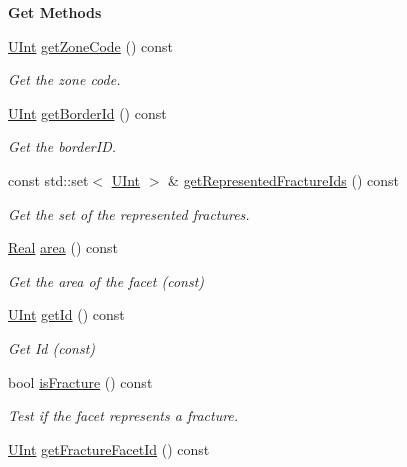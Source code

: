 \begin{Indent}{\bf Get Methods}
\begin{DoxyCompactItemize}
\hyperlink{namespaceFVCode3D_a4bf7e328c75d0fd504050d040ebe9eda}{U\+Int} \hyperlink{classFVCode3D_1_1Rigid__Mesh_1_1Facet_a051d02ca6fb8096021de8519cd6a90ed}{get\+Zone\+Code} () const 
\begin{DoxyCompactList}\small\item\em Get the zone code. \end{DoxyCompactList}\item 
\hyperlink{namespaceFVCode3D_a4bf7e328c75d0fd504050d040ebe9eda}{U\+Int} \hyperlink{classFVCode3D_1_1Rigid__Mesh_1_1Facet_a528828e73f43ae6fa5c858ecc5ab5a65}{get\+Border\+Id} () const 
\begin{DoxyCompactList}\small\item\em Get the border\+ID. \end{DoxyCompactList}\item 
const std\+::set$<$ \hyperlink{namespaceFVCode3D_a4bf7e328c75d0fd504050d040ebe9eda}{U\+Int} $>$ \& \hyperlink{classFVCode3D_1_1Rigid__Mesh_1_1Facet_a7155ca3065101f3fb37c539af05dc860}{get\+Represented\+Fracture\+Ids} () const 
\begin{DoxyCompactList}\small\item\em Get the set of the represented fractures. \end{DoxyCompactList}\item 
\hyperlink{namespaceFVCode3D_a40c1f5588a248569d80aa5f867080e83}{Real} \hyperlink{classFVCode3D_1_1Rigid__Mesh_1_1Facet_a19b2922eb0458019c8f34b40f0517789}{area} () const 
\begin{DoxyCompactList}\small\item\em Get the area of the facet (const) \end{DoxyCompactList}\item 
\hyperlink{namespaceFVCode3D_a4bf7e328c75d0fd504050d040ebe9eda}{U\+Int} \hyperlink{classFVCode3D_1_1Rigid__Mesh_1_1Facet_ac499aad62ec6d2d750a6a27d17d3814a}{get\+Id} () const 
\begin{DoxyCompactList}\small\item\em Get Id (const) \end{DoxyCompactList}\item 
bool \hyperlink{classFVCode3D_1_1Rigid__Mesh_1_1Facet_aed3f579d52847e839501f647e90c35ab}{is\+Fracture} () const 
\begin{DoxyCompactList}\small\item\em Test if the facet represents a fracture. \end{DoxyCompactList}\item 
\hyperlink{namespaceFVCode3D_a4bf7e328c75d0fd504050d040ebe9eda}{U\+Int} \hyperlink{classFVCode3D_1_1Rigid__Mesh_1_1Facet_a08dc369eccd02b29133187cede7511eb}{get\+Fracture\+Facet\+Id} () const 

\end{DoxyCompactItemize}
\end{Indent}
